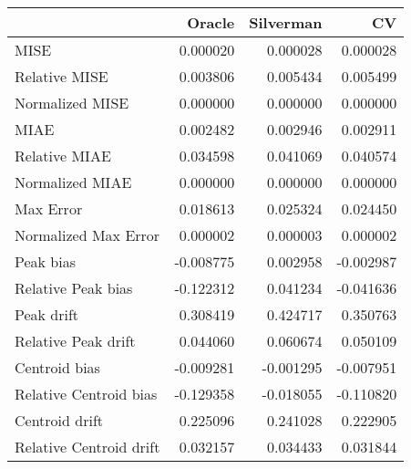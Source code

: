 \begin{tabular}{lrrr}
  \hline
 & Oracle & Silverman & CV \\ 
  \hline
MISE & 0.000020 & 0.000028 & 0.000028 \\ 
  Relative MISE & 0.003806 & 0.005434 & 0.005499 \\ 
  Normalized MISE & 0.000000 & 0.000000 & 0.000000 \\ 
  MIAE & 0.002482 & 0.002946 & 0.002911 \\ 
  Relative MIAE & 0.034598 & 0.041069 & 0.040574 \\ 
  Normalized MIAE & 0.000000 & 0.000000 & 0.000000 \\ 
  Max Error & 0.018613 & 0.025324 & 0.024450 \\ 
  Normalized Max Error & 0.000002 & 0.000003 & 0.000002 \\ 
  Peak bias & -0.008775 & 0.002958 & -0.002987 \\ 
  Relative Peak bias & -0.122312 & 0.041234 & -0.041636 \\ 
  Peak drift & 0.308419 & 0.424717 & 0.350763 \\ 
  Relative Peak drift & 0.044060 & 0.060674 & 0.050109 \\ 
  Centroid bias & -0.009281 & -0.001295 & -0.007951 \\ 
  Relative Centroid bias & -0.129358 & -0.018055 & -0.110820 \\ 
  Centroid drift & 0.225096 & 0.241028 & 0.222905 \\ 
  Relative Centroid drift & 0.032157 & 0.034433 & 0.031844 \\ 
   \hline
\end{tabular}
